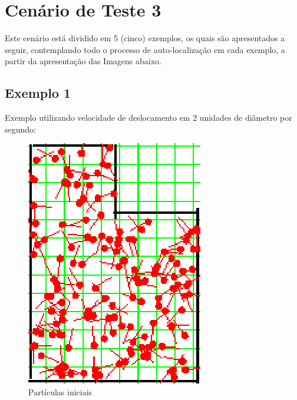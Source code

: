 \section{Cenário de Teste 3}

Este cenário está dividido em 5 (cinco) exemplos, os quais são apresentados a seguir, contemplando todo o processo de auto-localização
em cada exemplo, a partir da apresentação das Imagens abaixo.

\subsection{Exemplo 1}

Exemplo utilizando velocidade de deslocamento em 2 unidades de diâmetro por segundo:

\begin{figure}[H]
  \centering
  \includegraphics[scale=1]{figuras/cen3_ex1/1.eps}
  \caption[Partículas Iniciais]{Partículas iniciais}
  \label{img:cen3_ex1_1}
\end{figure}

